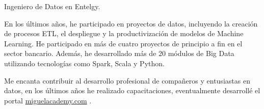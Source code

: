 

\begin{cvparagraph}


Ingeniero de Datos en Entelgy.

En los \'ultimos años, he participado en proyectos de datos, incluyendo la creaci\'on de procesos ETL, el despliegue y la productivizaci\'on de modelos de Machine Learning.
He participado en m\'as de cuatro proyectos de principio a fin en el sector bancario.
Adem\'as, he desarrollado m\'as de 20 m\'odulos de Big Data utilizando tecnolog\'ias como Spark, Scala y Python.


Me encanta contribuir al desarrollo profesional de compañeros y entusiastas en datos,
en los \'ultimos años he realizado capacitaciones, eventualmente desarroll\'e el portal \href{www.miguelacademy.com}{miguelacademy.com} .

\end{cvparagraph}
